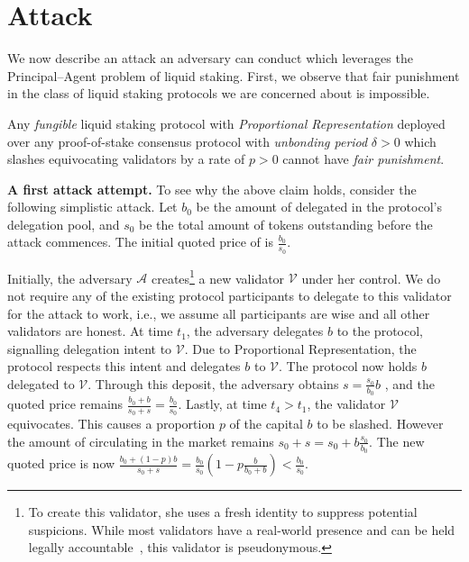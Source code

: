 \section{Attack}

We now describe an attack an adversary can conduct which leverages the
Principal--Agent problem of liquid staking. First, we observe that
fair punishment in the class of liquid staking protocols we are concerned
about is impossible.

\begin{claim}
Any \emph{fungible} liquid staking protocol with \emph{Proportional Representation}
deployed over any proof-of-stake consensus protocol with \emph{unbonding period}
$\delta > 0$ which slashes equivocating validators by a rate of $p > 0$
cannot have \emph{fair punishment}.
\end{claim}

\noindent
\textbf{A first attack attempt.}
To see why the above claim holds, consider the following simplistic attack.
Let $b_0$ be the amount of delegated \asset in the protocol's delegation pool,
and $s_0$ be the total amount of \stasset tokens outstanding
before the attack commences. The initial quoted price of \stasset
is $\frac{b_0}{s_0}$.

Initially,
the adversary $\mathcal{A}$ creates\footnote{To create this validator, she uses a fresh identity
to suppress potential suspicions. While most validators
have a real-world presence and can be held legally
accountable~\cite{liquid-staking-report}, this validator is pseudonymous.}
a new validator $\mathcal{V}$ under her control.
We do not require any of the existing protocol participants to delegate
to this validator for the attack to work, i.e., we assume all participants
are wise and all other validators are honest.
At time $t_1$, the adversary delegates $b$ \asset to the protocol,
signalling delegation intent to $\mathcal{V}$.
Due to Proportional Representation,
the protocol respects this intent and delegates $b$ \asset to $\mathcal{V}$.
The protocol now holds $b$ delegated \asset to $\mathcal{V}$.
Through this deposit, the adversary obtains
$s = \frac{s_0}{b_0} b$ \stasset, and the quoted price remains
$\frac{b_0 + b}{s_0 + s} = \frac{b_0}{s_0}$.
Lastly, at time $t_4 > t_1$, the validator
$\mathcal{V}$ equivocates. This causes a proportion $p$ of
the capital $b$ to be slashed.
However the amount of \stasset circulating in the
market remains $s_0 + s = s_0 + b\frac{s_0}{b_0}$.
The new quoted price is now
$\frac{b_0 + (1 - p)b}{s_0 + s} = \frac{b_0}{s_0}(1 - p\frac{b}{b_0 + b}) < \frac{b_0}{s_0}$.

